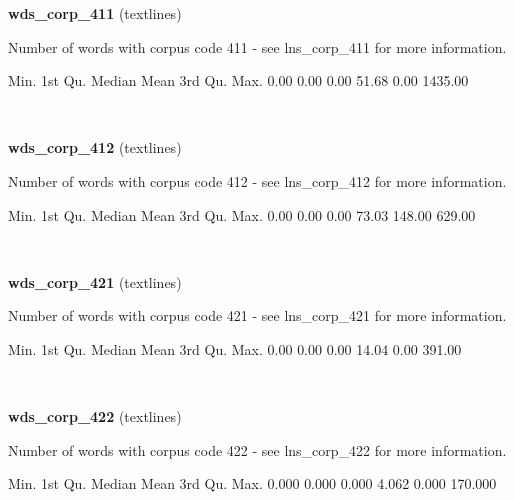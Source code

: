 \documentclass[]{article}
\newenvironment{Shaded}{\begin{snugshade}}{\end{snugshade}}
\newcommand{\FloatTok}[1]{\textcolor[rgb]{0.00,0.00,0.81}{{#1}}}
\newcommand{\NormalTok}[1]{{#1}}
\begin{document}
\textbf{wds\_corp\_411} (textlines)

Number of words with corpus code 411 - see lns\_corp\_411 for more
information.

\begin{Shaded}
\begin{Highlighting}[]
   \NormalTok{Min. 1st Qu.  Median    Mean 3rd Qu.    Max. }
   \FloatTok{0.00}    \FloatTok{0.00}    \FloatTok{0.00}   \FloatTok{51.68}    \FloatTok{0.00} \FloatTok{1435.00} 
\end{Highlighting}
\end{Shaded}

~

\vspace{1em}

\textbf{wds\_corp\_412} (textlines)

Number of words with corpus code 412 - see lns\_corp\_412 for more
information.

\begin{Shaded}
\begin{Highlighting}[]
   \NormalTok{Min. 1st Qu.  Median    Mean 3rd Qu.    Max. }
   \FloatTok{0.00}    \FloatTok{0.00}    \FloatTok{0.00}   \FloatTok{73.03}  \FloatTok{148.00}  \FloatTok{629.00} 
\end{Highlighting}
\end{Shaded}

~

\vspace{1em}

\textbf{wds\_corp\_421} (textlines)

Number of words with corpus code 421 - see lns\_corp\_421 for more
information.

\begin{Shaded}
\begin{Highlighting}[]
   \NormalTok{Min. 1st Qu.  Median    Mean 3rd Qu.    Max. }
   \FloatTok{0.00}    \FloatTok{0.00}    \FloatTok{0.00}   \FloatTok{14.04}    \FloatTok{0.00}  \FloatTok{391.00} 
\end{Highlighting}
\end{Shaded}

~

\vspace{1em}

\textbf{wds\_corp\_422} (textlines)

Number of words with corpus code 422 - see lns\_corp\_422 for more
information.

\begin{Shaded}
\begin{Highlighting}[]
   \NormalTok{Min. 1st Qu.  Median    Mean 3rd Qu.    Max. }
  \FloatTok{0.000}   \FloatTok{0.000}   \FloatTok{0.000}   \FloatTok{4.062}   \FloatTok{0.000} \FloatTok{170.000} 
\end{Highlighting}
\end{Shaded}
\end{document}
